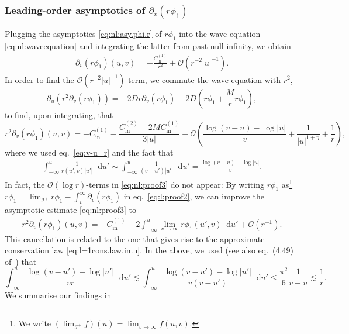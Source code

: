 \documentclass[11pt,english]{article}
\numberwithin{equation}{section}
\theoremstyle{remark}
\theoremstyle{plain}
\theoremstyle{remark}
\newcommand{\dd}{\mathop{}\!\mathrm{d}}
\newcommand{\pu}{\partial_u}
\newcommand{\pv}{\partial_v}
\renewcommand{\(}{\left(}
\renewcommand{\)}{\right)}
\newcommand{\cc}{C_{\mathrm{in}}^{(1)}}
\newcommand{\ccc}{C_{\mathrm{in}}^{(2)}}
\newcommand{\pho}{(r\phi_1)}
\begin{document}
\subsubsection{Leading-order asymptotics of \texorpdfstring{$\pv(r\phi_1)$}{d/dv(r phi1)}}
Plugging the asymptotics \eqref{eq:nl:asy.phi.r} of $r\phi_1$ into the wave equation \eqref{eq:nl:waveequation} and integrating the latter from past null infinity, we obtain
\begin{align}\label{eq:nl:pups}
\pv\pho(u,v)=-\frac{\cc}{r^2}+\mathcal{O}(r^{-2}|u|^{-1}).
\end{align}
In order to find the $\mathcal{O}(r^{-2}|u|^{-1})$-term, we commute the wave equation with $r^2$,
\begin{equation}\label{eq:l:proof2}
\pu(r^2\pv\pho)=-2Dr\pv\pho-2D\left(r\phi_1+\frac{M}{r}r\phi_1\right),
\end{equation}
to find, upon integrating, that
\begin{equation}\label{eq:nl:proof3}
r^2\pv\pho(u,v)=-\cc-\frac{\ccc-2M\cc}{3|u|}+\mathcal{O}\left(\frac{\log (v-u)-\log |u|}{v}+\frac{1}{|u|^{1+\eta}}+\frac{1}{r}\right),
\end{equation}
where we used eq.\ \eqref{eq:v-u=r} and the fact that
\begin{align}\label{eq:nl:stupidintegral1.5}
\int_{-\infty}^u\frac{1}{r(u',v)|u'|}\dd u'\sim\int_{-\infty}^u\frac{1}{(v-u')|u'|}\dd u'=\frac{\log(v-u)-\log|u|}{v}.
\end{align}
In fact, the $\mathcal O(\log r)$-terms in \eqref{eq:nl:proof3} do not appear: By writing $r\phi_1$ as\footnote{We write $(\lim_{\mathcal{I}^+}f)(u)=\lim_{v\to\infty}f(u,v)$.} $r\phi_1=\lim_{\mathcal{I}^+}r\phi_1-\int_v^\infty\pv\pho$ in eq.\ \eqref{eq:l:proof2}, we can improve the asymptotic estimate \eqref{eq:nl:proof3} to
\begin{align*}
r^2\pv\pho(u,v)=-\cc-2\int_{-\infty}^u\lim_{v\to\infty}r\phi_1(u',v)\dd u'+\mathcal{O}(r^{-1}).
\end{align*}
This cancellation is related to the one that gives rise to the approximate conservation law \eqref{eq:l=1cons.law.in.u}.
In the above, we used (see also eq.\ (4.49) of~\cite{I}) that 
\begin{equation}\label{eq:nl:stupidintegral2}
\int_{-\infty}^u \frac{\log(v-u')-\log|u'|}{vr}\dd u'\lesssim\int_{-\infty}^u \frac{\log(v-u')-\log|u'|}{v(v-u')}\dd u'\leq \frac{\pi^2}{6}\frac{1}{v-u}\lesssim \frac{1}{r}.
\end{equation}
We summarise our findings in
\end{document}
